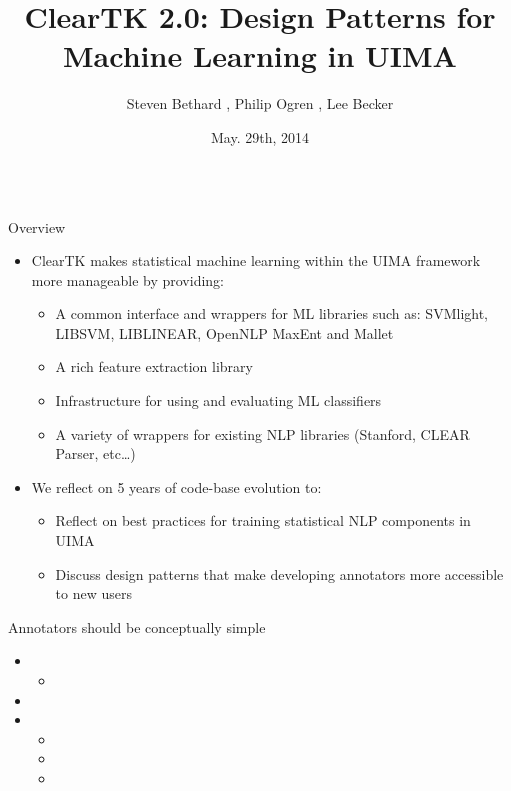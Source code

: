 \documentclass[final]{beamer}
\title{\Huge ClearTK 2.0: Design Patterns for Machine Learning in UIMA\\[0.2ex]}
\author{Steven Bethard \inst{1}, Philip Ogren \inst{2}, Lee Becker\inst{2}}
\institute[] %
{
  \inst{1}%
  University of Alabama at Birmingham, Birmingham, AL, USA
  \\
  \inst{2}%
  University of Colorado Boulder, Boulder, CO, USA
}
\date[May. 29th, 2014]{May. 29th, 2014}
\begin{document}
\begin{frame}{} 
\vspace{-1cm}
\begin{columns}[t]
  \begin{column}{.45\linewidth}
    
    \begin{block}{Overview}
      \begin{itemize}
      \item ClearTK makes statistical machine learning within the UIMA framework more manageable by providing:

        \begin{itemize}
        \item A common interface and wrappers for ML libraries such as: SVMlight, LIBSVM, LIBLINEAR, OpenNLP MaxEnt and Mallet
        \item A rich feature extraction library
        \item Infrastructure for using and evaluating ML classifiers
        \item A variety of wrappers for existing NLP libraries (Stanford, CLEAR Parser, etc\ldots)
        \end{itemize}

      \item We reflect on 5 years of code-base evolution to:
        \begin{itemize}
        \item Reflect on best practices for training statistical NLP components in UIMA
        \item Discuss design patterns that make developing annotators more accessible to new users
        \end{itemize}
      \end{itemize}
    \end{block}
    
    \begin{block}{Annotators should be conceptually simple}
      \begin{itemize}
      \item 
        \begin{itemize}
        \item 
        \end{itemize}
      \item 
      \item 
        \begin{itemize}
        \item 
        \item 
        \item 
        \end{itemize}
      \end{itemize}


\end{block}
\end{column}
\end{columns}
\end{frame}
\end{document}

